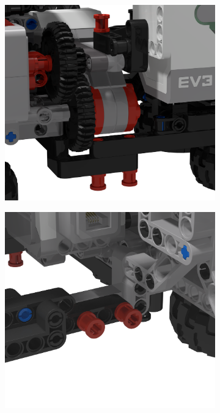 \documentclass{report}
\begin{document}
	\begin{figure}[H]
		\centering
		\begin{subfigure}[b]{0.25\textwidth}
			\includegraphics[width=\textwidth]{Resources/Images/rdrModulePins1.png}
			\label{fig:rdrModulePins1}
		\end{subfigure}
		\hspace{10mm}
		\begin{subfigure}[b]{0.25\textwidth}
			\includegraphics[width=\textwidth]{Resources/Images/rdrModulePins2.png}

\end{subfigure}
\end{figure}
\end{document}
